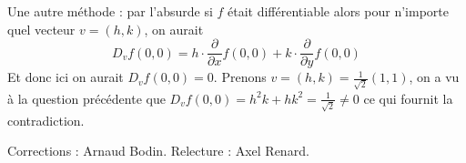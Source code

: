 \documentclass[11pt,a4paper]{article}
\theoremstyle{exostyle}
\begin{document}
\begin{enumerate}
	Une autre méthode : par l'absurde si $f$ était différentiable
	alors pour n'importe quel vecteur $v=(h,k)$, on aurait 
	\[D_v f(0,0) = h \cdot \frac{\partial }{\partial x} f(0,0)
	+ k \cdot \frac{\partial }{\partial y} f(0,0)\]
	Et donc ici on aurait $D_v f(0,0) = 0$.
	Prenons $v=(h,k)=\frac{1}{\sqrt2}(1,1)$, on a vu à la question précédente que 
	$D_v f(0,0) = h^2k+hk^2 = \frac{1}{\sqrt2} \neq 0$ ce qui fournit la contradiction.
\end{enumerate}
	
\fincorrection

\finexercice


\bigskip

Corrections : Arnaud Bodin. Relecture : Axel Renard.
\end{document}
